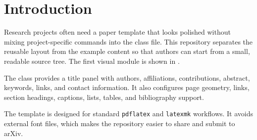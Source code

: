 \section{Introduction}

Research projects often need a paper template that looks polished without
mixing project-specific commands into the class file. This repository separates
the reusable layout from the example content so that authors can start from a
small, readable source tree. The first visual module is shown in
.

The class provides a title panel with authors, affiliations, contributions,
abstract, keywords, links, and contact information. It also configures page
geometry, links, section headings, captions, lists, tables, and bibliography
support.

The template is designed for standard \texttt{pdflatex} and \texttt{latexmk}
workflows. It avoids external font files, which makes the repository easier to
share and submit to arXiv.


